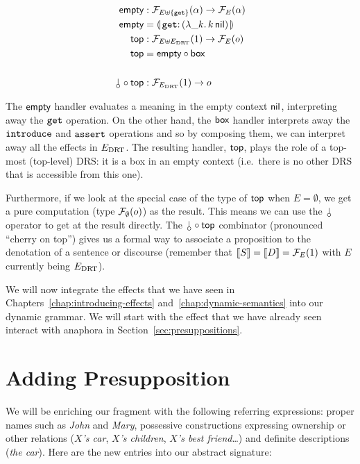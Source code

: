 \begin{align*}
  \EMPTY &: \FF_{E \uplus \{\op{get}\}}(\alpha) \to \FF_E(\alpha) \\
  \EMPTY &= \banana{\onto{\op{get}}{(\lam{\_ k}{\ap{k}{\nil}})}} \\
  \TOP &: \FF_{E \uplus E_\DRT}(1) \to \FF_{E}(o) \\
  \TOP &= \EMPTY \comp \BOX \\
  \\
  \cherry \comp \TOP &: \FF_{E_\DRT}(1) \to o
\end{align*}

The $\textsf{empty}$ handler evaluates a meaning in the empty context $\textsf{nil}$,
interpreting away the $\mathtt{get}$ operation. On the other hand, the $\textsf{box}$
handler interprets away the $\mathtt{introduce}$ and $\mathtt{assert}$ operations
and so by composing them, we can interpret away all the effects in
$E_{\mathrm{DRT}}$. The resulting handler, $\textsf{top}$, plays the role of a top-most
(top-level) DRS: it is a box in an empty context (i.e.\ there is no other
DRS that is accessible from this one).

Furthermore, if we look at the special case of the type of $\textsf{top}$ when
$E = \emptyset$, we get a pure computation (type $\mathcal{F}_\emptyset(o)$) as the
result. This means we can use the $\cherry$ operator to get at the result
directly. The $\cherry \comp \TOP$ combinator (pronounced ``cherry on
top'') gives us a formal way to associate a proposition to the denotation
of a sentence or discourse (remember that $\llbracket S \rrbracket = \llbracket D \rrbracket = \mathcal{F}_E(1)$
with $E$ currently being $E_{\mathrm{DRT}}$).

We will now integrate the effects that we have seen in
Chapters~\ref{chap:introducing-effects} and~\ref{chap:dynamic-semantics}
into our dynamic grammar. We will start with the effect that we have
already seen interact with anaphora in Section~\ref{sec:presuppositions}.


\section{Adding Presupposition}
\label{sec:adding-presupposition}

We will be enriching our fragment with the following referring expressions:
proper names such as \emph{John} and \emph{Mary}, possessive constructions
expressing ownership or other relations (\emph{$X$'s car}, \emph{$X$'s
  children}, \emph{$X$'s best friend}\ldots) and definite descriptions
(\emph{the car}). Here are the new entries into our abstract signature:

